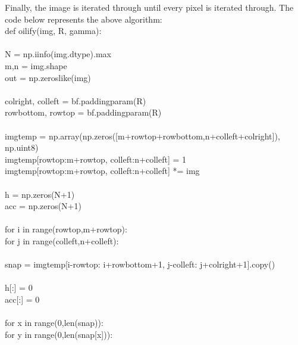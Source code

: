 \documentclass{article}
\begin{document}
	Finally, the image is iterated through until every pixel is iterated through. The code below represents the above algorithm:\\
	
	\noindent def oilify(img, R, gamma):\\
	\\
	\indent N = np.iinfo(img.dtype).max\\
	\indent m,n = img.shape\\
	\indent out = np.zeros\textunderscore like(img)\\
	\\
	\indent col\textunderscore right, col\textunderscore left = bf.padding\textunderscore param(R)\\
	\indent row\textunderscore bottom, row\textunderscore top = bf.padding\textunderscore param(R)\\
	\\
	\indent img\textunderscore temp = np.array(np.zeros([m+row\textunderscore top+row\textunderscore bottom,n+col\textunderscore left+col\textunderscore right]), np.uint8)\\
	\indent img\textunderscore temp[row\textunderscore top:m+row\textunderscore top, col\textunderscore left:n+col\textunderscore left] = 1\\
	\indent img\textunderscore temp[row\textunderscore top:m+row\textunderscore top, col\textunderscore left:n+col\textunderscore left] *= img\\
	\\
	\indent h = np.zeros(N+1)\\
	\indent acc = np.zeros(N+1)\\
	\\
	\indent for i in range(row\textunderscore top,m+row\textunderscore top):\\
	\indent \indent for j in range(col\textunderscore left,n+col\textunderscore left):\\
	\\
	\indent \indent \indent snap = img\textunderscore temp[i-row\textunderscore top: i+row\textunderscore bottom+1, j-col\textunderscore left: j+col\textunderscore right+1].copy()\\
	\\
	\indent \indent \indent h[:] = 0\\
	\indent \indent \indent acc[:] = 0\\
	\\
	\indent \indent \indent for x in range(0,len(snap)):\\
	\indent \indent \indent \indent for y in range(0,len(snap[x])):\\
\end{document}
